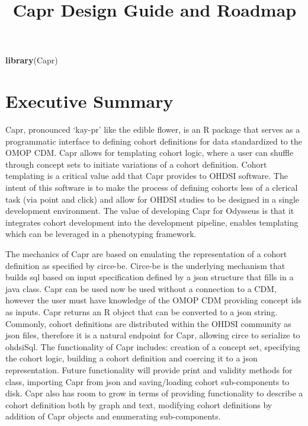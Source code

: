 \documentclass[
]{article}
\title{Capr Design Guide and Roadmap}
\author{}
\date{\vspace{-2.5em}}
\newenvironment{Shaded}{\begin{snugshade}}{\end{snugshade}}
\newcommand{\FunctionTok}[1]{\textcolor[rgb]{0.13,0.29,0.53}{\textbf{#1}}}
\newcommand{\NormalTok}[1]{#1}
\begin{document}
\maketitle

{
\setcounter{tocdepth}{2}
\tableofcontents
}
\begin{Shaded}
\begin{Highlighting}[]
\FunctionTok{library}\NormalTok{(Capr)}
\end{Highlighting}
\end{Shaded}

\section{Executive Summary}\label{executive-summary}

Capr, pronounced `kay-pr' like the edible flower, is an R package that
serves as a programmatic interface to defining cohort definitions for
data standardized to the OMOP CDM. Capr allows for templating cohort
logic, where a user can shuffle through concept sets to initiate
variations of a cohort definition. Cohort templating is a critical value
add that Capr provides to OHDSI software. The intent of this software is
to make the process of defining cohorts less of a clerical task (via
point and click) and allow for OHDSI studies to be designed in a single
development environment. The value of developing Capr for Odysseus is
that it integrates cohort development into the development pipeline,
enables templating which can be leveraged in a phenotyping framework.

The mechanics of Capr are based on emulating the representation of a
cohort definition as specified by circe-be. Circe-be is the underlying
mechanism that builds sql based on input specification defined by a json
structure that fills in a java class. Capr can be used now be used
without a connection to a CDM, however the user must have knowledge of
the OMOP CDM providing concept ids as inputs. Capr returns an R object
that can be converted to a json string. Commonly, cohort definitions are
distributed within the OHDSI community as json files, therefore it is a
natural endpoint for Capr, allowing circe to serialize to ohdsiSql. The
functionality of Capr includes: creation of a concept set, specifying
the cohort logic, building a cohort definition and coercing it to a json
representation. Future functionality will provide print and validity
methods for class, importing Capr from json and saving/loading cohort
sub-components to disk. Capr also has room to grow in terms of providing
functionality to describe a cohort definition both by graph and text,
modifying cohort definitions by addition of Capr objects and enumerating
sub-components.
\end{document}
